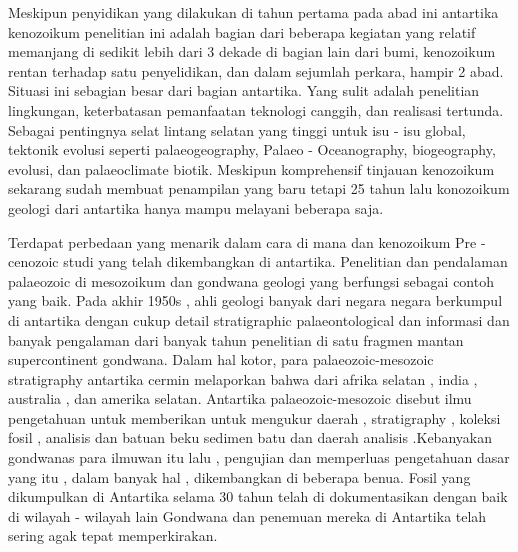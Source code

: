		Meskipun penyidikan yang dilakukan di tahun pertama pada abad ini antartika kenozoikum penelitian ini adalah bagian dari beberapa kegiatan yang 
	relatif memanjang di sedikit lebih dari 3 dekade di bagian lain dari bumi, kenozoikum rentan terhadap satu penyelidikan, dan dalam sejumlah perkara, 
	hampir 2 abad. Situasi ini sebagian besar dari bagian antartika. Yang sulit adalah penelitian lingkungan, keterbatasan pemanfaatan teknologi canggih, 
	dan realisasi tertunda. Sebagai pentingnya selat lintang selatan yang tinggi untuk isu - isu global, tektonik evolusi seperti  palaeogeography, 
	Palaeo - Oceanography, biogeography, evolusi, dan palaeoclimate biotik. Meskipun komprehensif tinjauan kenozoikum sekarang sudah membuat penampilan yang baru 
	tetapi 25 tahun lalu konozoikum geologi dari antartika hanya mampu melayani beberapa saja.
	
		Terdapat perbedaan yang menarik dalam cara di mana dan kenozoikum Pre - cenozoic studi yang telah dikembangkan di antartika.
	Penelitian dan pendalaman palaeozoic di mesozoikum dan gondwana  geologi yang berfungsi sebagai contoh yang baik. Pada akhir 1950s , 
	ahli geologi banyak dari negara negara berkumpul di antartika dengan cukup detail stratigraphic palaeontological dan informasi dan banyak pengalaman 
	dari banyak tahun penelitian di satu fragmen mantan supercontinent gondwana. Dalam hal kotor, para palaeozoic-mesozoic stratigraphy antartika 
	cermin melaporkan bahwa dari afrika selatan , india , australia , dan amerika selatan. Antartika palaeozoic-mesozoic disebut ilmu pengetahuan untuk 
	memberikan untuk mengukur daerah , stratigraphy , koleksi fosil , analisis dan batuan beku sedimen batu dan daerah analisis .Kebanyakan gondwanas  
	para ilmuwan itu lalu , pengujian dan memperluas pengetahuan dasar yang itu , dalam banyak hal , dikembangkan di beberapa benua. 
	Fosil yang dikumpulkan di Antartika selama 30 tahun telah di dokumentasikan dengan baik di wilayah - wilayah lain Gondwana dan penemuan mereka di Antartika 
	telah sering agak tepat memperkirakan. 
	
